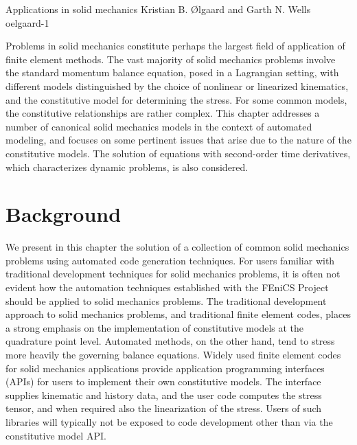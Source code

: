               {Applications in solid mechanics}
              {Kristian B. {\O}lgaard and Garth N. Wells}
              {oelgaard-1}

Problems in solid mechanics constitute perhaps the largest field of
application of finite element methods. The vast majority of solid
mechanics problems involve the standard momentum balance equation,
posed in a Lagrangian setting, with different models distinguished by the
choice of nonlinear or linearized kinematics, and the constitutive model
for determining the stress. For some common models, the constitutive
relationships are rather complex. This chapter addresses a number of
canonical solid mechanics models in the context of automated modeling,
and focuses on some pertinent issues that arise due to the nature of the
constitutive models. The solution of equations with second-order time
derivatives, which characterizes dynamic problems, is also considered.

\section{Background}

We present in this chapter the solution of a collection of common
solid mechanics problems using automated code generation techniques.
For users familiar with traditional development techniques for
solid mechanics problems, it is often not evident how the automation
techniques established with the FEniCS Project should be applied to
solid mechanics problems.  The traditional development approach to solid
mechanics problems, and traditional finite element codes, places a strong
emphasis on the implementation of constitutive models at the quadrature
point level. Automated methods, on the other hand, tend to stress more
heavily the governing balance equations.  Widely used finite element
codes for solid mechanics applications provide application programming
interfaces (APIs) for users to implement their own constitutive models.
The interface supplies kinematic and history data, and the user code
computes the stress tensor, and when required also the linearization
of the stress. Users of such libraries will typically not be exposed to
code development other than via the constitutive model API.

